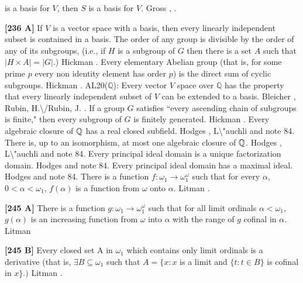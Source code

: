 is a basis for $V$, then $S$ is a basis for $V$.  \ac{Gross} \cite{1975},
\cite{1976}.
\smallskip
\item{}{\bf [236 A]} If $V$ is a vector space with a basis, then every
linearly independent subset is contained in a basis.
\medskip
{} The order of any group is divisible by the order
of any of its subgroups, (i.e., if $H$ is a subgroup of $G$ then there
is a set $A$ such that $|H\times A| = |G|$.)  \ac{Hickman} \cite{1976}.
\medskip
{} Every elementary Abelian group (that is, for
some prime $p$ every non identity element has order $p$) is the direct sum
of cyclic subgroups.  \ac{Hickman} \cite{1976}.
\medskip
{} AL20($\mathbb Q$):  Every vector $V$ space over
$\mathbb Q$ has the property that every linearly independent subset of $V$
can be extended to a basis. \ac{Bleicher} \cite{1964}, \ac{Rubin,
H.\/Rubin, J.} \cite{1985, p.119, AL20}.
\medskip
{} If a group $G$ satisfies ``every ascending chain
of subgroups is finite," then every subgroup of $G$ is finitely generated.
\ac{Hickman} \cite{1976}.
\medskip
{} Every algebraic closure of $\Bbb Q$ has a real
closed subfield.  \ac{Hodges} \cite{1976a}, \ac{L\"auchli} \cite{1962}
and note 84.
\medskip
{} There is, up to an isomorphism, at most one algebraic
closure of ${\Bbb Q}$.  \ac{Hodges} \cite{1976a}, \ac{L\"auchli}
\cite{1962} and note 84.
\medskip
{}  Every  principal ideal domain is a unique
factorization domain.  \ac{Hodges} \cite{1976a} and note 84.
\medskip
{} Every principal ideal domain has a maximal ideal.
\ac{Hodges} \cite{1976a} and note 84.
\medskip
{} There is a function $f :\omega_1\rightarrow
\omega^{\omega}_1$ such that for every $\alpha$, $0 < \alpha < \omega_1$,
$f(\alpha )$ is a function from $\omega$ onto $\alpha$. \ac{Litman}
\cite{1976}.
\smallskip
\item{}{\bf [245 A]} There is a function $g : \omega_1\rightarrow
\omega^{\omega}_1$ such that for all limit ordinals $\alpha < \omega_1$,
$g(\alpha)$ is an increasing function from $\omega$  into $\alpha$ with
the range of $g$ cofinal in $\alpha$.  \ac{Litman} \cite{1976}
\smallskip
\item{}{\bf [245 B]} Every closed set A in $\omega_1$ which contains
only limit ordinals is a derivative  (that is, $\exists B\subseteq
\omega_{1}$ such that $A = \{x: x$ is a limit and $\{t: t\in B\}$
is cofinal in $x\}.)$  \ac{Litman} \cite{1976}.
